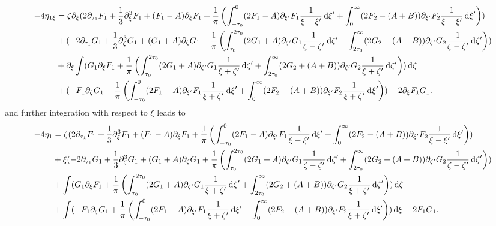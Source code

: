 \documentclass[10pt,reqno,oneside,a4paper, landscape]{article}
\begin{document}
\begin{equation}
\begin{aligned}
- 4\eta_{1\xi} &= \zeta \partial_\xi (2 \partial_{\tau_1}F_1 + \frac{1}{3} \partial_\xi^3 F_1 + (F_1-A) \partial_\xi F_1 + \frac{1}{\pi} \left(\int^0_{-\tau_0} (2 F_1  - A)\partial_{\xi'} F_1\frac{1}{\xi -\xi'} \,\mathrm{d} \xi' + \int^{\infty}_{0} (2 F_2 - (A+B))\partial_{\xi'} F_2 \frac{1}{\xi -\xi'} \,\mathrm{d} \xi' \right))  \\
&+(- 2 \partial_{\tau_1} G_1 +  \frac{1}{3} \partial_\zeta^3 G_1+ (G_1 +A) \partial_{\zeta} G_1  + \frac{1}{\pi} \left( \int^{2\tau_0}_{\tau_0} (2 G_1 + A) \partial_{\zeta'} G_1 \frac{1}{\zeta -\zeta'} \,\mathrm{d} \zeta' + \int^{\infty}_{2\tau_0} (2 G_2+(A+B)) \partial_{\zeta'} G_2 \frac{1}{\zeta -\zeta'} \,\mathrm{d} \zeta'   \right)) \\
&+ \partial_{\xi}\int (G_1 \partial_\xi F_1 + \frac{1}{\pi}\left(\int^{2\tau_0}_{\tau_0} (2 G_1+ A) \partial_{\zeta'} G_1  \frac{1}{\xi + \zeta'} \,\mathrm{d} \zeta' + \int^{\infty}_{2\tau_0} (2 G_2 + (A+B))\partial_{\zeta'} G_2 \frac{1}{\xi + \zeta'} \,\mathrm{d} \zeta' \right)  )\,\mathrm{d} \zeta  \\
&+(-F_1\partial_\zeta G_1 + \frac{1}{\pi} \left(\int^0_{-\tau_0} (2 F_1-A) \partial_{\xi'} F_1 \frac{1}{\xi + \zeta'} \,\mathrm{d} \xi' + \int^{\infty}_{0} (2 F_2 -(A+B))\partial_{\xi'} F_2 \frac{1}{\xi + \zeta'} \,\mathrm{d} \xi' \right)) - 2 \partial_\xi F_1 G_1. 
\end{aligned}
\end{equation}
and further integration with respect to $\xi$ leads to
\begin{align*}
- 4\eta_{1} &= \zeta (2 \partial_{\tau_1}F_1 + \frac{1}{3} \partial_\xi^3 F_1 + (F_1-A)\partial_\xi F_1 + \frac{1}{\pi} \left(\int^0_{-\tau_0} (2 F_1  - A)\partial_{\xi'} F_1\frac{1}{\xi -\xi'} \,\mathrm{d} \xi' + \int^{\infty}_{0} (2 F_2 - (A+B))\partial_{\xi'} F_2 \frac{1}{\xi -\xi'} \,\mathrm{d} \xi'\right) ) \\
&+\xi (- 2 \partial_{\tau_1} G_1 +  \frac{1}{3} \partial_\zeta^3 G_1+ (G_1+A) \partial_{\zeta} G_1 + \frac{1}{\pi} \left( \int^{2\tau_0}_{\tau_0} (2 G_1 + A) \partial_{\zeta'} G_1 \frac{1}{\zeta -\zeta'} \,\mathrm{d} \zeta' + \int^{\infty}_{2\tau_0} (2 G_2+(A+B)) \partial_{\zeta'} G_2 \frac{1}{\zeta -\zeta'} \,\mathrm{d} \zeta' \right) )\\
&+ \int (G_1 \partial_\xi F_1 + \frac{1}{\pi}\left(\int^{2\tau_0}_{\tau_0} (2 G_1+ A) \partial_{\zeta'} G_1  \frac{1}{\xi + \zeta'} \,\mathrm{d} \zeta' + \int^{\infty}_{2\tau_0} (2 G_2 + (A+B))\partial_{\zeta'} G_2 \frac{1}{\xi + \zeta'} \,\mathrm{d} \zeta'
\right)  )\,\mathrm{d} \zeta \\
&+\int (-F_1\partial_\zeta G_1 + \frac{1}{\pi} \left(\int^0_{-\tau_0} (2 F_1-A) \partial_{\xi'} F_1 \frac{1}{\xi + \zeta'} \,\mathrm{d} \xi' + \int^{\infty}_{0} (2 F_2 -(A+B))\partial_{\xi'} F_2 \frac{1}{\xi + \zeta'} \,\mathrm{d} \xi' \right))\,\mathrm{d} \xi - 2 F_1 G_1. 
\end{align*}
\end{document}

